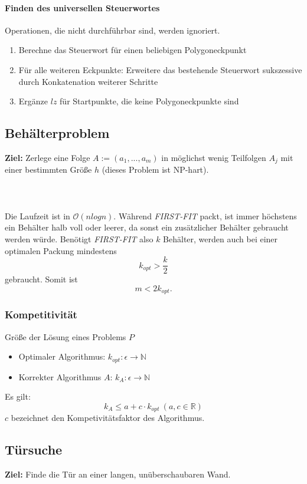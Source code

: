 \paragraph{Finden des universellen Steuerwortes}
Operationen, die nicht durchführbar sind, werden ignoriert.
\begin{enumerate}
	\item Berechne das Steuerwort für einen beliebigen Polygoneckpunkt
	\item Für alle weiteren Eckpunkte: Erweitere das bestehende Steuerwort sukszessive durch Konkatenation weiterer Schritte
	\item Ergänze \(lz\) für Startpunkte, die keine Polygoneckpunkte sind
\end{enumerate}


\subsection{Behälterproblem}
\textbf{Ziel:} Zerlege eine Folge \(A := (a_1,...,a_m)\) in möglichst wenig Teilfolgen \(A_j\) mit einer bestimmten Größe \(h\) (dieses Problem ist NP-hart).
\text{}\\\\

\text{}\\\\
Die Laufzeit ist in \(\mathcal{O}(nlogn)\). Während \textit{FIRST-FIT} packt, ist immer höchstens ein Behälter halb voll oder leerer, da sonst ein zusätzlicher Behälter gebraucht werden würde. Benötigt \textit{FIRST-FIT} also \(k\) Behälter, werden auch bei einer optimalen Packung mindestens
\[k_{opt} > \frac{k}{2}\]
gebraucht. Somit ist
\[m < 2k_{opt}.\]

\subsubsection{Kompetitivität}
Größe der Lösung eines Problems \(P\)
\begin{itemize}
	\item Optimaler Algorithmus: \(k_{opt}: \epsilon \rightarrow \mathbb{N}\)
	\item Korrekter Algorithmus \(A\): \(k_A: \epsilon \rightarrow \mathbb{N}\)
\end{itemize}
Es gilt:
\[k_A \leq a+c\cdot k_{opt}~(a,c \in \mathbb{R})\]
\(c\) bezeichnet den Kompetivitätsfaktor des Algorithmus.


\subsection{Türsuche}
\textbf{Ziel:} Finde die Tür an einer langen, unüberschaubaren Wand.
\text{}\\



